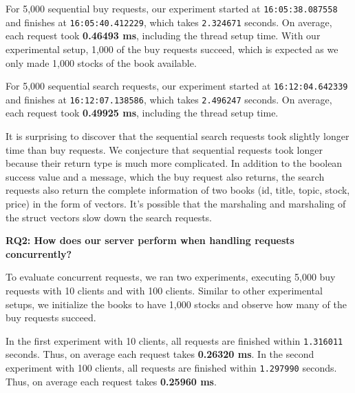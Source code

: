 \documentclass[letterpaper,11pt,twocolumn]{article}
\begin{document}
For 5,000 sequential buy requests, our experiment started at \texttt{16:05:38.087558} and finishes at \texttt{16:05:40.412229}, which takes \texttt{2.324671} seconds. On average, each request took \textbf{0.46493 ms}, including the thread setup time.
With our experimental setup, 1,000 of the buy requests succeed, which is expected as we only made 1,000 stocks of the book available.


For 5,000 sequential search requests, our experiment started at \texttt{16:12:04.642339} and finishes at \texttt{16:12:07.138586}, which takes \texttt{2.496247} seconds. On average, each request took \textbf{0.49925 ms}, including the thread setup time.

It is surprising to discover that the sequential search requests took slightly longer time than buy requests. We conjecture that sequential requests took longer because their return type is much more complicated. In addition to the boolean success value and a message, which the buy request also returns, the search requests also return the complete information of two books (id, title, topic, stock, price) in the form of vectors. It's possible that the marshaling and marshaling of the struct vectors slow down the search requests.


\textbf{RQ2: How does our server perform when handling requests concurrently?}

To evaluate concurrent requests, we ran two experiments, executing 5,000 buy requests with 10 clients and with 100 clients. Similar to other experimental setups, we initialize the books to have 1,000 stocks and observe how many of the buy requests succeed.

In the first experiment with 10 clients, all requests are finished within \texttt{1.316011} seconds. Thus, on average each request takes \textbf{0.26320 ms}.
In the second experiment with 100 clients, all requests are finished within \texttt{1.297990} seconds. Thus, on average each request takes \textbf{0.25960 ms}.
\end{document}
